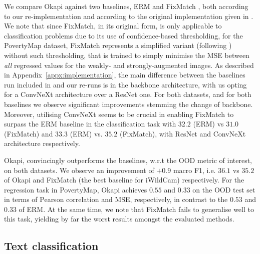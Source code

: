 We compare Okapi against two baselines, ERM and FixMatch \citep{sohn2020fixmatch},
both according to our re-implementation and according to the original implementation given in
\cite{SagWeiLeeGaoetal22}.
%
We note that since FixMatch, in its original form, is only applicable to classification problems
due to its use of confidence-based thresholding, for the PovertyMap dataset, FixMatch represents a
simplified variant (following \citep{SagWeiLeeGaoetal22}) without such thresholding, that is
trained to simply minimise the MSE between \emph{all} regressed values for the weakly- and
strongly-augmented images.
%
As described in Appendix~\ref{appx:implementation}, the main difference between the baselines run included in
\cite{SagWeiLeeGaoetal22} and our re-runs is in the backbone architecture, with us opting for a
ConvNeXt  \citep{liu2022convnet} architecture over a ResNet one.
%
For both datasets, and for both baselines we observe significant improvements stemming the change
of backbone.
%
%
Moreover, utilising ConvNeXt seems to be crucial in enabling FixMatch to surpass the ERM baseline
in the classification task with $32.2$ (ERM) vs $31.0$ (FixMatch) and $33.3$ (ERM) vs. $35.2$
(FixMatch), with ResNet and ConvNeXt architecture respectively. 
% 

Okapi, convincingly outperforms the baselines, w.r.t the OOD metric of interest, on both datasets. 
%
We observe an improvement of $+0.9$ macro F1, i.e. $36.1$ vs $35.2$ of Okapi and FixMatch (the best
baseline for iWildCam) respectively. For the regression task in PovertyMap, Okapi achieves $0.55$
and $0.33$ on the OOD test set in terms of Pearson correlation and MSE, respectively, in contrast
to the $0.53$ and $0.33$ of ERM.
%
At the same time, we note that FixMatch fails to generalise well to this task, yielding by far the
worst results amongst the evaluated methods.

\subsection{Text classification}

